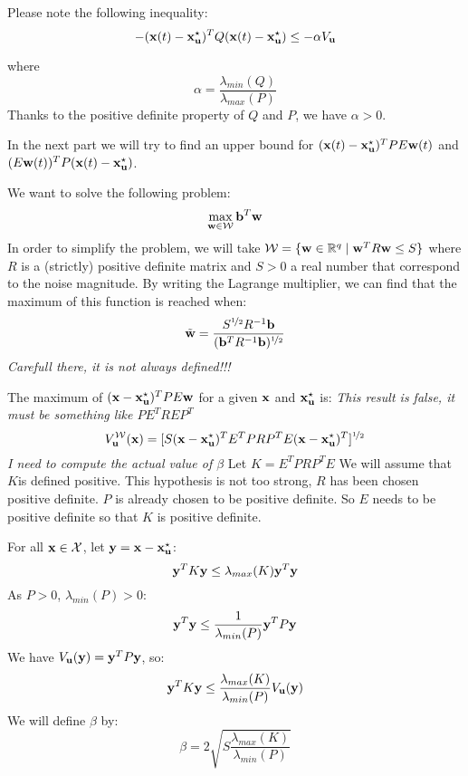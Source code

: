 Please note the following inequality:
\begin{equation}
- ( \mathbf{x}(t) -  \mathbf{x}^{\star}_{ \mathbf{u}})^T Q ( \mathbf{x}(t) -  \mathbf{x}^{\star}_{ \mathbf{u}}) \leq - \alpha V_{ \mathbf{u}}
\end{equation}

where
\begin{equation}
\alpha = \frac{\lambda_{min}(Q)}{\lambda_{max}(P)}
\end{equation}
Thanks to the positive definite property of $Q$ and $P$, we have $\alpha>0$.

In the next part we will try to find an upper bound for $( \mathbf{x}(t) -  \mathbf{x}^{\star}_{ \mathbf{u}})^T P E  \mathbf{w}(t)$ and $(E  \mathbf{w}(t))^T P ( \mathbf{x}(t) -  \mathbf{x}^{\star}_{ \mathbf{u}})$.

We want to solve the following problem:
\begin{equation} \label{eq:max_w}
\max_{ \mathbf{w} \in \mathcal{W}}  \mathbf{b}^T  \mathbf{w}
\end{equation}
In order to simplify the problem, we will take $\mathcal{W} = \{  \mathbf{w} \in \mathbb{R}^q \mid  \mathbf{w}^T R  \mathbf{w} \leq S\}$ where $R$ is a (strictly) positive definite matrix and $S>0$ a real number that correspond to the noise magnitude.
By writing the Lagrange multiplier, we can find that the maximum of this function is reached when:
\begin{equation}
\tilde{ \mathbf{w}} = \frac{S^{\nicefrac{1}{2}} R^{-1}  \mathbf{b}}{( \mathbf{b}^T R^{-1}  \mathbf{b})^{\nicefrac{1}{2}}}
\end{equation}
\textit{Carefull there, it is not always defined!!!}

The maximum of $( \mathbf{x} -  \mathbf{x}^{\star}_{ \mathbf{u}})^T P E  \mathbf{w}$ for a given $ \mathbf{x}$ and $ \mathbf{x}^{\star}_{ \mathbf{u}}$ is:
\newcommand{\Vwu}{V_{\vect{u}}^{\mathcal{W}}}
\textit{This result is false, it must be something like $P E^T R E P^T $}
\begin{equation}
\Vwu(\vect{x}) = [S (\vect{x} -\xu)^T E^T P R P^T E (\vect{x} -\xu)^T ]^{\nicefrac{1}{2}}
\end{equation}
\textit{I need to compute the actual value of $\beta$}
Let $K = E^T P R P^T E$
We will assume that $K$is defined positive.
This hypothesis is not too strong, $R$ has been chosen positive definite.
$P$ is already chosen to be positive definite.
So $E$ needs to be positive definite so that $K$ is positive definite.

For all $ \mathbf{x} \in \mathcal{X}$, let $ \mathbf{y} =  \mathbf{x} - \mathbf{x}^{\star}_{ \mathbf{u}}$:
$$ \mathbf{y}^T K  \mathbf{y} \leq  \lambda_{max}(K)  \mathbf{y}^T  \mathbf{y}$$
As $P>0$, $\lambda_{min}(P)>0$:
$$ \mathbf{y}^T  \mathbf{y} \leq \frac{1}{\lambda_{min}(P)}   \mathbf{y}^T P  \mathbf{y}$$
We have $V_{ \mathbf{u}}( \mathbf{y}) =  \mathbf{y}^T P  \mathbf{y}$, so:
$$ \mathbf{y}^T K  \mathbf{y} \leq \frac{\lambda_{max}(K)}{\lambda_{min}(P)}  V_{ \mathbf{u}}( \mathbf{y})$$
\newcommand{\Bu}{\beta}
We will define $\Bu$ by:
$$\Bu = 2\sqrt{S \frac{\lambda_{max}(K)}{\lambda_{min}(P)} }$$

